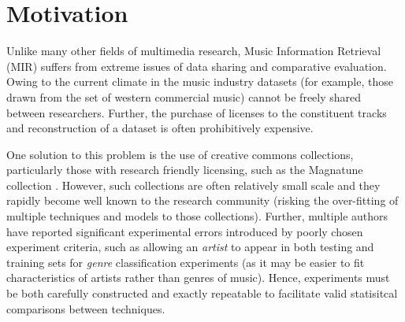 \documentclass[conference]{IEEEtran}
\begin{document}
%





\section{Motivation}
Unlike many other fields of multimedia research, Music Information Retrieval (MIR) suffers from extreme issues of data sharing and comparative evaluation. Owing to the current climate in the music industry datasets (for example, those drawn from the set of western commercial music) cannot be freely shared between researchers. Further, the purchase of licenses to the constituent tracks and reconstruction of a dataset is often prohibitively expensive. 

One solution to this problem is the use of creative commons collections, particularly those with research friendly licensing, such as the Magnatune collection \cite{magnatune}. However, such collections are often relatively small scale and they rapidly become well known to the research community (risking the over-fitting of multiple techniques and models to those collections). Further, multiple authors \cite{albumeffect,pampalk:thesis} have reported significant experimental errors introduced by poorly chosen experiment criteria, such as allowing an \emph{artist} to appear in both testing and training sets for \emph{genre} classification experiments (as it may be easier to fit characteristics of artists rather than genres of music). Hence, experiments must be both carefully constructed and exactly repeatable to facilitate valid statisitcal comparisons between techniques.
\end{document}
